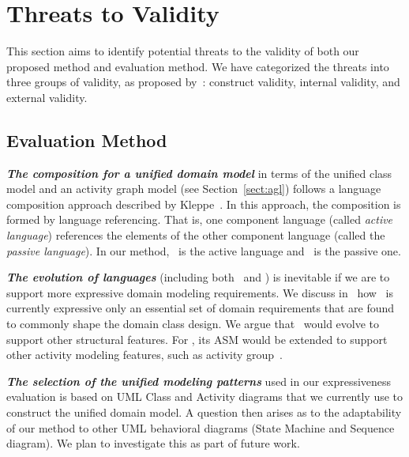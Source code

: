 \section{Threats to Validity} \label{sect:threats}
This section aims to identify potential threats to the validity of both our proposed method and evaluation method. We have categorized the threats into three groups of validity, as proposed by~\cite{runeson2009guidelines}: construct validity, internal validity, and external validity.

\subsection{Evaluation Method}
%

\textbf{\textit{The composition for a unified domain model}} in terms of the unified class model and an activity graph model (see Section~\ref{sect:agl}) follows a language composition approach described by Kleppe~\cite{kleppe_software_2008}. In this approach, the composition is formed by language referencing. That is, one component language (called \textit{active language}) references the elements of the other component language (called the \textit{passive language}). In our method, \agl~is the active language and \dcsl~is the passive one.

\textbf{\textit{The evolution of languages}} (including both \agl~and \dcsl) is inevitable if we are to support 
more expressive domain modeling requirements. We discuss in~\cite{le_domain_2018} how \dcsl~is currently expressive only \wrt an essential set of domain requirements that are found to commonly shape the domain class design. We argue that \dcsl~would evolve to support other structural features. For \agl, its ASM would be extended to support other activity modeling features, such as activity group~\cite[p. 405]{omg_unified_2017}.

\textbf{\textit{The selection of the unified modeling patterns}} used in our expressiveness evaluation is based on UML Class and Activity diagrams that we currently use to construct the unified domain model. A question then arises as to the adaptability of our method to other UML behavioral diagrams (\eg State Machine and Sequence diagram). We plan to investigate this as part of future work.
%

